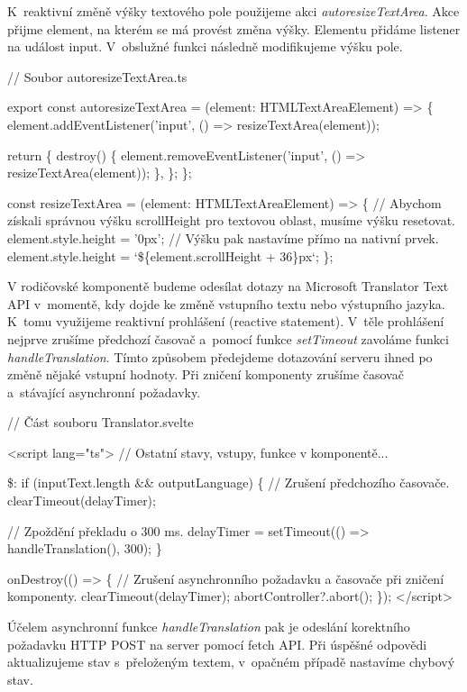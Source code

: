 K~reaktivní změně výšky textového pole použijeme akci \emph{autoresizeTextArea}. Akce přijme element, na kterém se má provést změna výšky. Elementu přidáme listener na událost input. 
V~obslužné funkci následně modifikujeme výšku pole.

\begin{prog}
// Soubor autoresizeTextArea.ts

export const autoresizeTextArea = (element: HTMLTextAreaElement) => \{
  element.addEventListener('input', () => resizeTextArea(element));

  return \{
    destroy() \{
      element.removeEventListener('input', () => resizeTextArea(element));
    \},
  \};
\};

const resizeTextArea = (element: HTMLTextAreaElement) => \{
  // Abychom získali správnou výšku scrollHeight 
    pro textovou oblast, musíme výšku resetovat.
  element.style.height = '0px';
  // Výšku pak nastavíme přímo na nativní prvek.
  element.style.height = `\$\{element.scrollHeight + 36\}px`;
\};
\end{prog}

V rodičovské komponentě budeme odesílat dotazy na Microsoft Translator Text API \cite{translatortextapi} v~momentě, kdy dojde ke změně vstupního textu nebo výstupního jazyka. 
K~tomu využijeme reaktivní prohlášení (reactive statement). V~těle prohlášení nejprve zrušíme předchozí časovač a~pomocí funkce \emph{setTimeout} zavoláme funkci \emph{handleTranslation}. 
Tímto způsobem předejdeme dotazování serveru ihned po změně nějaké vstupní hodnoty. Při zničení komponenty zrušíme časovač a~stávající asynchronní požadavky.

\begin{prog}
// Část souboru Translator.svelte

<script lang="ts">
  // Ostatní stavy, vstupy, funkce v komponentě...
  
  \$: if (inputText.length && outputLanguage) \{
    // Zrušení předchozího časovače.
    clearTimeout(delayTimer);

    // Zpoždění překladu o 300 ms.
    delayTimer = setTimeout(() => handleTranslation(), 300);
  \}

  onDestroy(() => \{
    // Zrušení asynchronního požadavku a časovače při zničení komponenty.
    clearTimeout(delayTimer);
    abortController?.abort();
  \});
</script>
\end{prog}

Účelem asynchronní funkce \emph{handleTranslation} pak je odeslání korektního požadavku HTTP POST na server pomocí fetch API. 
Při úspěšné odpovědi aktualizujeme stav s~přeloženým textem, v~opačném případě nastavíme chybový stav.

